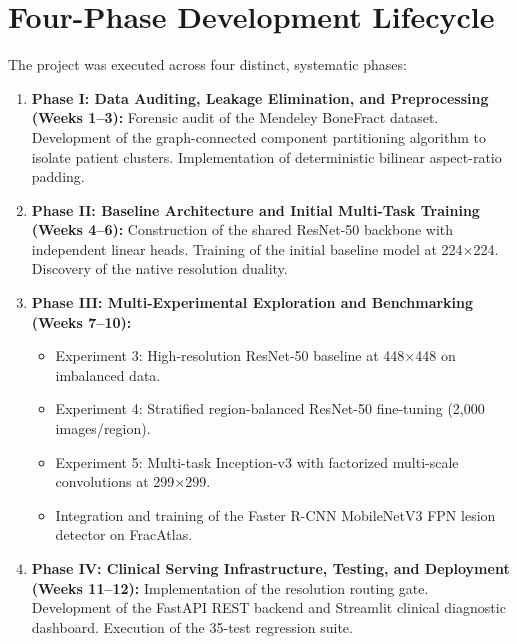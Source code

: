 \documentclass[12pt, a4paper]{report}
\begin{document}
\section{Four-Phase Development Lifecycle}
The project was executed across four distinct, systematic phases:
\begin{enumerate}[leftmargin=*]
    \item \textbf{Phase I: Data Auditing, Leakage Elimination, and Preprocessing (Weeks 1–3):} Forensic audit of the Mendeley BoneFract dataset. Development of the graph-connected component partitioning algorithm to isolate patient clusters. Implementation of deterministic bilinear aspect-ratio padding.
    \item \textbf{Phase II: Baseline Architecture and Initial Multi-Task Training (Weeks 4–6):} Construction of the shared ResNet-50 backbone with independent linear heads. Training of the initial baseline model at 224$\times$224. Discovery of the native resolution duality.
    \item \textbf{Phase III: Multi-Experimental Exploration and Benchmarking (Weeks 7–10):}
    \begin{itemize}
        \item Experiment 3: High-resolution ResNet-50 baseline at 448$\times$448 on imbalanced data.
        \item Experiment 4: Stratified region-balanced ResNet-50 fine-tuning (2,000 images/region).
        \item Experiment 5: Multi-task Inception-v3 with factorized multi-scale convolutions at 299$\times$299.
        \item Integration and training of the Faster R-CNN MobileNetV3 FPN lesion detector on FracAtlas.
    \end{itemize}
    \item \textbf{Phase IV: Clinical Serving Infrastructure, Testing, and Deployment (Weeks 11–12):} Implementation of the resolution routing gate. Development of the FastAPI REST backend and Streamlit clinical diagnostic dashboard. Execution of the 35-test regression suite.
\end{enumerate}
\end{document}
